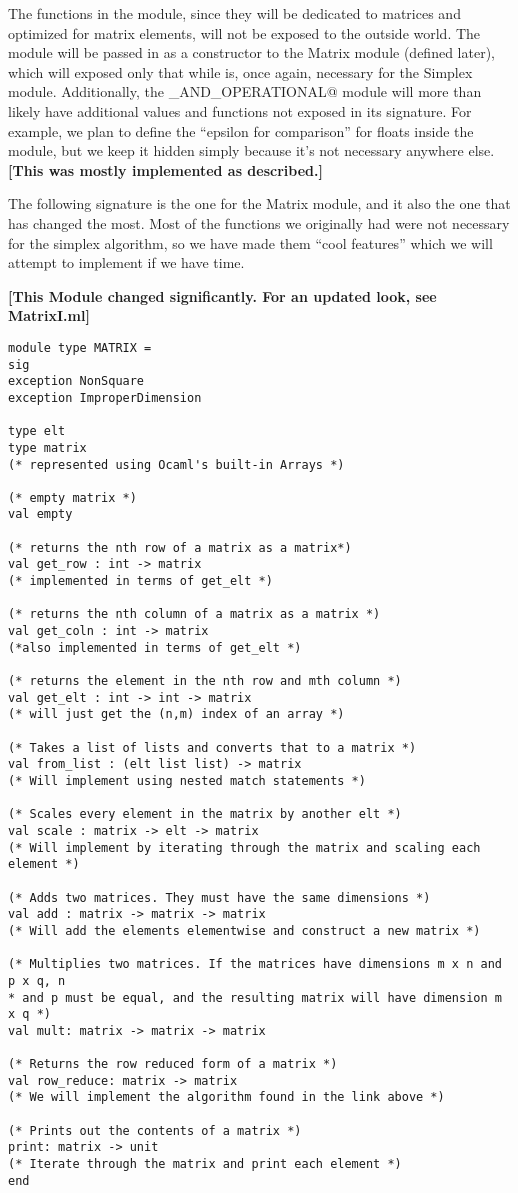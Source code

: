 \documentclass[letterpaper,11pt]{article}
\newcommand{\annot}[1]{\textbf{\color{BrickRed} [#1]}}
\begin{document}
The functions in the module, since they will be dedicated to matrices and
optimized for matrix elements, will not be exposed to the outside world. The
module will be passed in as a constructor to the Matrix module (defined later),
which will exposed only that while is, once again, necessary for the Simplex
module. Additionally, the \verb@ORDERED_AND_OPERATIONAL@ module will more than
likely have additional values and functions not exposed in its signature. For
example, we plan to define the “epsilon for comparison” for floats inside the
module, but we keep it hidden simply because it's not necessary anywhere else.
{\annot{This was mostly implemented as described.}}

The following signature is the one for the Matrix module, and it also the one
that has changed the most. Most of the functions we originally had were not
necessary for the simplex algorithm, so we have made them ``cool features''
which we will attempt to implement if we have time.

{\annot{This Module changed significantly. For an updated look, see MatrixI.ml}}
\begin{verbatim}
module type MATRIX =
sig
exception NonSquare
exception ImproperDimension

type elt
type matrix
(* represented using Ocaml's built-in Arrays *)

(* empty matrix *)
val empty

(* returns the nth row of a matrix as a matrix*)
val get_row : int -> matrix
(* implemented in terms of get_elt *)

(* returns the nth column of a matrix as a matrix *)
val get_coln : int -> matrix
(*also implemented in terms of get_elt *)

(* returns the element in the nth row and mth column *)
val get_elt : int -> int -> matrix 
(* will just get the (n,m) index of an array *)

(* Takes a list of lists and converts that to a matrix *)
val from_list : (elt list list) -> matrix
(* Will implement using nested match statements *)

(* Scales every element in the matrix by another elt *)
val scale : matrix -> elt -> matrix
(* Will implement by iterating through the matrix and scaling each element *)

(* Adds two matrices. They must have the same dimensions *)
val add : matrix -> matrix -> matrix
(* Will add the elements elementwise and construct a new matrix *)

(* Multiplies two matrices. If the matrices have dimensions m x n and p x q, n
* and p must be equal, and the resulting matrix will have dimension m x q *)
val mult: matrix -> matrix -> matrix

(* Returns the row reduced form of a matrix *)
val row_reduce: matrix -> matrix
(* We will implement the algorithm found in the link above *)

(* Prints out the contents of a matrix *)
print: matrix -> unit
(* Iterate through the matrix and print each element *)
end
\end{verbatim}
\end{document}
